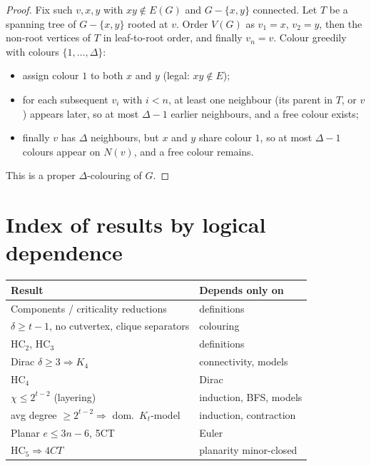 \documentclass[11pt]{article}
\theoremstyle{definition}
\begin{document}
\begin{proof}
Fix such \(v,x,y\) with \(xy\notin E(G)\) and \(G-\{x,y\}\) connected. Let \(T\) be
a spanning tree of \(G-\{x,y\}\) rooted at \(v\). Order \(V(G)\) as
\(v_1=x\), \(v_2=y\), then the non-root vertices of \(T\) in leaf-to-root order,
and finally \(v_n=v\). Colour greedily with colours \(\{1,\dots,\Delta\}\):
\begin{itemize}
\item assign colour \(1\) to both \(x\) and \(y\) (legal: \(xy\notin E\));
\item for each subsequent \(v_i\) with \(i<n\), at least one neighbour (its parent
in \(T\), or \(v\)) appears later, so at most \(\Delta-1\) earlier neighbours, and
a free colour exists;
\item finally \(v\) has \(\Delta\) neighbours, but \(x\) and \(y\) share colour
\(1\), so at most \(\Delta-1\) colours appear on \(N(v)\), and a free colour
remains.
\end{itemize}
This is a proper \(\Delta\)-colouring of \(G\).
\end{proof}

\section{Index of results by logical dependence}

\begin{center}
\begin{tabular}{ll}
\hline
Result & Depends only on \\
\hline
Components / criticality reductions & definitions \\
\(\delta\ge t-1\), no cutvertex, clique separators & colouring \\
\(\mathrm{HC}_2\), \(\mathrm{HC}_3\) & definitions \\
Dirac \(\delta\ge 3\Rightarrow K_4\) & connectivity, models \\
\(\mathrm{HC}_4\) & Dirac \\
\(\chi\le 2^{t-2}\) (layering) & induction, BFS, models \\
avg degree \(\ge 2^{t-2}\Rightarrow\) dom.\ \(K_t\)-model & induction, contraction \\
Planar \(e\le 3n-6\), 5CT & Euler \\
\(\mathrm{HC}_5\Rightarrow 4CT\) & planarity minor-closed \\
\hline
\end{tabular}
\end{center}
\end{document}
